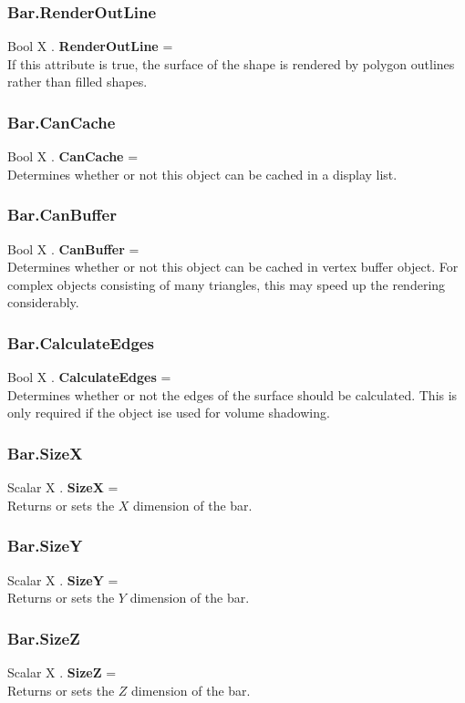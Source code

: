 \documentclass[10pt]{book}
\begin{document}
\subsubsection{Bar.RenderOutLine \label{F:Bar:RenderOutLine}}
Bool X . \textbf{RenderOutLine} = \\
If this attribute is true, the surface of the shape is rendered by polygon outlines rather than filled shapes.

\subsubsection{Bar.CanCache \label{F:Bar:CanCache}}
Bool X . \textbf{CanCache} = \\
Determines whether or not this object can be cached in a display list.

\subsubsection{Bar.CanBuffer \label{F:Bar:CanBuffer}}
Bool X . \textbf{CanBuffer} = \\
Determines whether or not this object can be cached in vertex buffer object. For complex objects consisting of many triangles, this may speed up the rendering considerably.

\subsubsection{Bar.CalculateEdges \label{F:Bar:CalculateEdges}}
Bool X . \textbf{CalculateEdges} = \\
Determines whether or not the edges of the surface should be calculated. This is only required if the object ise used for volume shadowing.

\subsubsection{Bar.SizeX \label{F:Bar:SizeX}}
Scalar X . \textbf{SizeX} = \\
Returns or sets the $X$ dimension of the bar.

\subsubsection{Bar.SizeY \label{F:Bar:SizeY}}
Scalar X . \textbf{SizeY} = \\
Returns or sets the $Y$ dimension of the bar.

\subsubsection{Bar.SizeZ \label{F:Bar:SizeZ}}
Scalar X . \textbf{SizeZ} = \\
Returns or sets the $Z$ dimension of the bar.
\end{document}
